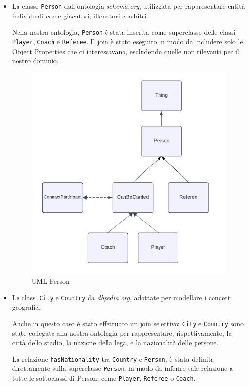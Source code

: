 \documentclass[11pt]{report} %
\begin{document}
\begin{itemize}
  \item La classe \texttt{Person} dall'ontologia \textit{schema.org}, utilizzata per rappresentare entità individuali come giocatori, illenatori e arbitri. 
  
  Nella nostra ontologia, \texttt{Person} è stata inserita come superclasse delle classi \texttt{Player}, \texttt{Coach} e \texttt{Referee}. Il join è stato eseguito in modo da includere solo le Object Properties che ci interessavano, escludendo quelle non rilevanti per il nostro dominio.

  \begin{figure}[H]
      \centering
      \includegraphics[width=0.8\linewidth]{PERSON.png}
      \caption{UML Person}
  \end{figure}
    \newpage
  \item Le classi \texttt{City} e \texttt{Country} da \textit{dbpedia.org}, adottate per modellare i concetti geografici. 
  
  Anche in questo caso è stato effettuato un join selettivo: \texttt{City} e \texttt{Country} sono state collegate alla nostra ontologia per rappresentare, rispettivamente, la città dello stadio, la nazione della lega, e la nazionalità delle persone.
  
  La relazione \texttt{hasNationality} tra \texttt{Country} e \texttt{Person}, è stata definita direttamente sulla superclasse \texttt{Person}, in modo da inferire tale relazione a tutte le sottoclassi di Person: come \texttt{Player}, \texttt{Referee} o \texttt{Coach}.
\end{itemize}
\end{document}
